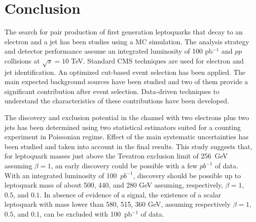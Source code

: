 %

\section{Conclusion}

The search for pair production of first generation leptoquarks that decay to
an electron and a jet has been studies using a MC simulation.
The analysis strategy and detector performance assume an integrated luminosity of 100 pb$^{-1}$ and $pp$ collisions 
at $\sqrt{s}=10$ TeV.
Standard CMS techniques are used for electron and jet identification. 
An optimized cut-based event selection has been applied.
The main expected background sources have been studied and two of them provide 
a significant contribution after event selection. 
Data-driven techniques to understand the characteristics of these contributions have been developed.

The discovery and exclusion potential in the channel with two electrons plus two jets has 
been determined using two statistical estimators suited for a counting experiment in Poissonian regime.
Effect of the main systematic uncertainties has been studied and taken into account in the final 
results. This study suggests that, 
for leptoquark masses just above the Tevatron exclusion limit of 256~GeV assuming $\beta=1$, 
an early discovery could be possible with a few $pb^{-1}$ of data.
With an integrated luminosity of 100~$pb^{-1}$, discovery should be possible up
to leptoquark mass of about 500, 440, and 280 GeV assuming, respectively, 
$\beta=1$, $0.5$, and $0.1$. 
In absence of evidence of a signal, the existence of a scalar leptoquark 
with mass lower than 580, 515, 360 GeV, assuming respectively 
$\beta=1$, $0.5$, and $0.1$, can be excluded with 100~pb$^{-1}$ of data.




%
